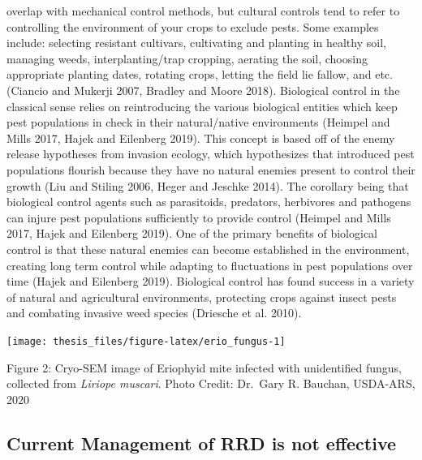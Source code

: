 \documentclass[12pt,final,CPage]{ufthesis}
\begin{document}
{overlap with mechanical control methods, but cultural controls tend to refer to controlling the environment of your crops to exclude pests. Some examples include: selecting resistant cultivars, cultivating and planting in healthy soil, managing weeds, interplanting/trap cropping, aerating the soil, choosing appropriate planting dates, rotating crops, letting the field lie fallow, and etc. (Ciancio and Mukerji 2007, Bradley and Moore 2018). Biological control in the classical sense relies on reintroducing the various biological entities which keep pest populations in check in their natural/native environments (Heimpel and Mills 2017, Hajek and Eilenberg 2019). This concept is based off of the enemy release hypotheses from invasion ecology, which hypothesizes that introduced pest populations flourish because they have no natural enemies present to control their growth (Liu and Stiling 2006, Heger and Jeschke 2014). The corollary being that biological control agents such as parasitoids, predators, herbivores and pathogens can injure pest populations sufficiently to provide control (Heimpel and Mills 2017, Hajek and Eilenberg 2019). One of the primary benefits of biological control is that these natural enemies can become established in the environment, creating long term control while adapting to fluctuations in pest populations over time (Hajek and Eilenberg 2019). Biological control has found success in a variety of natural and agricultural environments, protecting crops against insect pests and combating invasive weed species (Driesche et al. 2010).
  \begin{center}\texttt{[image: thesis\_files/figure-latex/erio\_fungus-1]} \end{center}

  Figure 2: Cryo-SEM image of Eriophyid mite infected with unidentified fungus, collected from \emph{Liriope muscari}. Photo Credit: Dr.~Gary R. Bauchan, USDA-ARS, 2020

  \hypertarget{litrev-manage}{%
  \subsection{Current Management of RRD is not effective}\label{litrev-manage}}

}
\end{document}

